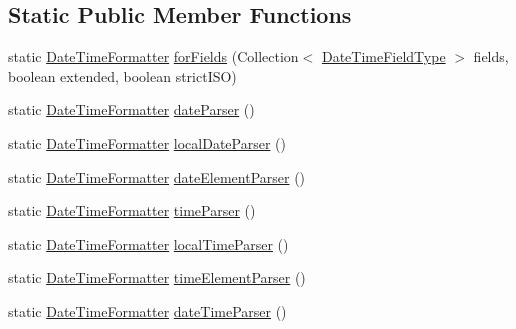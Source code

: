 \subsection*{Static Public Member Functions}
\begin{DoxyCompactItemize}
\item 
static \hyperlink{classorg_1_1joda_1_1time_1_1format_1_1_date_time_formatter}{Date\-Time\-Formatter} \hyperlink{classorg_1_1joda_1_1time_1_1format_1_1_i_s_o_date_time_format_afc5638018568c6af700702aa8c45e54f}{for\-Fields} (Collection$<$ \hyperlink{classorg_1_1joda_1_1time_1_1_date_time_field_type}{Date\-Time\-Field\-Type} $>$ fields, boolean extended, boolean strict\-I\-S\-O)
\item 
static \hyperlink{classorg_1_1joda_1_1time_1_1format_1_1_date_time_formatter}{Date\-Time\-Formatter} \hyperlink{classorg_1_1joda_1_1time_1_1format_1_1_i_s_o_date_time_format_a8793356e66e496647f3c0142837e7e98}{date\-Parser} ()
\item 
static \hyperlink{classorg_1_1joda_1_1time_1_1format_1_1_date_time_formatter}{Date\-Time\-Formatter} \hyperlink{classorg_1_1joda_1_1time_1_1format_1_1_i_s_o_date_time_format_a0d1e62184af21c6cadce18c823222520}{local\-Date\-Parser} ()
\item 
static \hyperlink{classorg_1_1joda_1_1time_1_1format_1_1_date_time_formatter}{Date\-Time\-Formatter} \hyperlink{classorg_1_1joda_1_1time_1_1format_1_1_i_s_o_date_time_format_a27cbb075ac88b34b31711f2813788842}{date\-Element\-Parser} ()
\item 
static \hyperlink{classorg_1_1joda_1_1time_1_1format_1_1_date_time_formatter}{Date\-Time\-Formatter} \hyperlink{classorg_1_1joda_1_1time_1_1format_1_1_i_s_o_date_time_format_a39cf108df5b2db4ca5fbe22ef6cd569a}{time\-Parser} ()
\item 
static \hyperlink{classorg_1_1joda_1_1time_1_1format_1_1_date_time_formatter}{Date\-Time\-Formatter} \hyperlink{classorg_1_1joda_1_1time_1_1format_1_1_i_s_o_date_time_format_a688415e96a6c79aba3c897dfadd556ee}{local\-Time\-Parser} ()
\item 
static \hyperlink{classorg_1_1joda_1_1time_1_1format_1_1_date_time_formatter}{Date\-Time\-Formatter} \hyperlink{classorg_1_1joda_1_1time_1_1format_1_1_i_s_o_date_time_format_ace9df7bdc0a9a46be54222adb2a2e915}{time\-Element\-Parser} ()
\item 
static \hyperlink{classorg_1_1joda_1_1time_1_1format_1_1_date_time_formatter}{Date\-Time\-Formatter} \hyperlink{classorg_1_1joda_1_1time_1_1format_1_1_i_s_o_date_time_format_a4e280ceba11dcc91ee4c81f9286baa71}{date\-Time\-Parser} ()

\end{DoxyCompactItemize}
